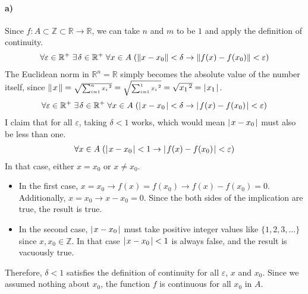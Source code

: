 \documentclass[12pt]{article}
\newcommand\+{\mkern2mu}
\let\eps\varepsilon
\begin{document}
\paragraph{a)}
Since $f: A \subset \mathbb{Z} \subset \mathbb{R} \rightarrow \mathbb{R}$, we can take $n$ and $m$ to be $1$ and apply the definition of continuity.
\begin{gather*}
\forall \eps \in \mathbb{R}^+ \; \exists \+ \delta \in \mathbb{R}^+ \; \forall x \in A \; (\Vert x - x_0 \Vert < \delta \rightarrow \Vert f(x) - f(x_0) \Vert < \eps)
\end{gather*}
The Euclidean norm in $\mathbb{R}^n = \mathbb{R}$ simply becomes the absolute value of the number itself, since $\Vert \+ x \+ \Vert = \sqrt{\scriptstyle\sum_{i = 1}^{n} x_i \+ ^2} = \sqrt{\scriptstyle\sum_{i = 1}^{1}x_i \+ ^2} = \sqrt{x_1 \+ ^2} = \vert \+ x_1 \+ \vert$.
\begin{gather*}
\forall \eps \in \mathbb{R}^+ \; \exists \+ \delta \in \mathbb{R}^+ \; \forall x \in A \; (\vert \+ x - x_0 \+ \vert < \delta \rightarrow \vert \+ f(x) - f(x_0) \+ \vert < \eps)
\end{gather*}
I claim that for all $\eps$, taking $\delta < 1$ works, which would mean $\vert \+ x - x_0 \+ \vert$ must also be less than one.
\begin{gather*} %
\forall x \in A \; (\vert \+ x - x_0 \+ \vert < 1 \rightarrow \vert \+ f(x) - f(x_0) \+ \vert < \eps)
\end{gather*}
In that case, either $x = x_0$ or $x \neq x_0$.
\begin{itemize}
\item In the first case, $x = x_0 \rightarrow f(x) = f(x_0) \rightarrow f(x) - f (x_0) = 0$.
Additionally, $x = x_0 \rightarrow x - x_0 = 0$.
Since the both sides of the implication are true, the result is true.
\item In the second case, $\vert \+ x - x_0 \+ \vert$ must take positive integer values like $\{1, 2, 3, \dotsc\}$ since $x, x_0 \in \mathbb{Z}$.
In that case $\vert \+ x - x_0 \+ \vert < 1$ is always false, and the result is vacuously true.
\end{itemize}
Therefore, $\delta < 1$ satisfies the definition of continuity for all $\eps$, $x$ and $x_0$.
Since we assumed nothing about $x_0$, the function $f$ is continuous for all $x_0$ in $A$.
\end{document}
